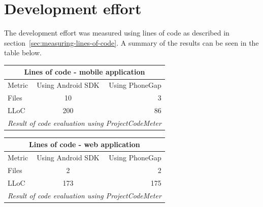 \section{Development effort}\label{sec:development-effort}
The development effort was measured using lines of code as described in section~\ref{sec:measuring-lines-of-code}. A summary of the results can be seen in the table below.

\begin{tabular}{ | l | c | r | }
    \hline
    \multicolumn{3}{|c|}{Lines of code - mobile application} \\
    \hline
	Metric & Using Android SDK &  Using PhoneGap \\
	\hline
	Files & 10 & 3\\
	LLoC & 200 & 86\\	
	\hline
	\multicolumn{3}{c}{\emph{Result of code evaluation using ProjectCodeMeter}}
\end{tabular}

\begin{tabular}{ | l | c | r | }
    \hline
    \multicolumn{3}{|c|}{Lines of code - web application} \\
    \hline
	Metric & Using Android SDK & Using PhoneGap \\
	\hline
	Files & 2 & 2 \\
	LLoC & 173 & 175 \\	
	\hline
	\multicolumn{3}{c}{\emph{Result of code evaluation using ProjectCodeMeter}}
\end{tabular}

